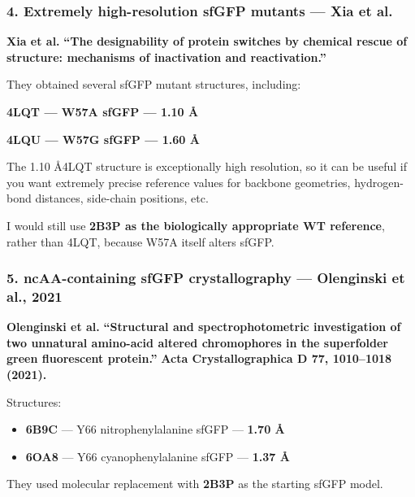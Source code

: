 \documentclass{article}
\begin{document}
\subsubsection*{4. Extremely high-resolution sfGFP mutants --- Xia et al.}

\textbf{Xia et al.}
\textbf{``The designability of protein switches by chemical rescue of structure: mechanisms of inactivation and reactivation.''}

They obtained several sfGFP mutant structures, including:

\textbf{4LQT --- W57A sfGFP --- 1.10 \AA}

\textbf{4LQU --- W57G sfGFP --- 1.60 \AA}

The 1.10 \AA 4LQT structure is exceptionally high resolution, so it can be useful if you want extremely precise reference values for backbone geometries, hydrogen-bond distances, side-chain positions, etc. \href{https://www.rcsb.org/structure/4LQT}{\textbullet}

\href{https://www.rcsb.org/structure/4LQT}{\textbullet}

I would still use \textbf{2B3P as the biologically appropriate WT reference}, rather than 4LQT, because W57A itself alters sfGFP.

\subsubsection*{5. ncAA-containing sfGFP crystallography --- Olenginski et al., 2021}

\textbf{Olenginski et al.}
\textbf{``Structural and spectrophotometric investigation of two unnatural amino-acid altered chromophores in the superfolder green fluorescent protein.''}
\textbf{Acta Crystallographica D 77, 1010--1018 (2021).}

Structures:

\begin{itemize}
    \item \textbf{6B9C} --- Y66 nitrophenylalanine sfGFP --- \textbf{1.70 \AA}
    \item \textbf{6OA8} --- Y66 cyanophenylalanine sfGFP --- \textbf{1.37 \AA}
\end{itemize}

They used molecular replacement with \textbf{2B3P} as the starting sfGFP model. \href{https://pmc.ncbi.nlm.nih.gov/articles/PMC8329867/}{\textbullet}

\href{https://pmc.ncbi.nlm.nih.gov/articles/PMC8329867/}{\textbullet}
\end{document}
